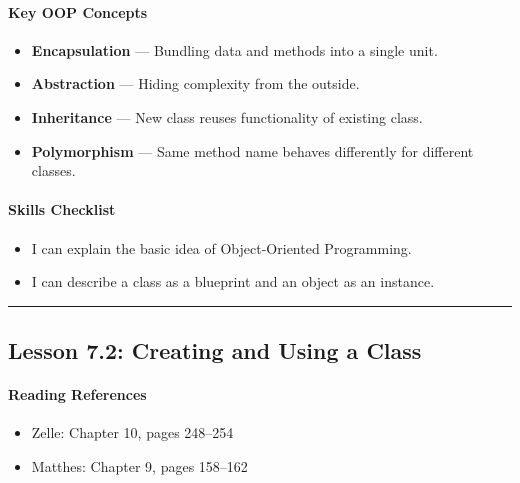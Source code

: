 \documentclass[
  justified,
  openright,
]{tufte-book}
\let\subsubsection\paragraph
\let\paragraph\paragraph
\let\subsubsection\paragraph
\let\paragraph\paragraph
\providecommand{\tightlist}{%
  \setlength{\itemsep}{0pt}\setlength{\parskip}{0pt}}
\begin{document}
\subsubsection{Key OOP Concepts}\label{key-oop-concepts}

\begin{itemize}
\tightlist
\item
  \textbf{Encapsulation} --- Bundling data and methods into a single
  unit.
\item
  \textbf{Abstraction} --- Hiding complexity from the outside.
\item
  \textbf{Inheritance} --- New class reuses functionality of existing
  class.
\item
  \textbf{Polymorphism} --- Same method name behaves differently for
  different classes.
\end{itemize}

\subsubsection{Skills Checklist}\label{skills-checklist-32}

\begin{itemize}
\tightlist
\item[$\square$]
  I can explain the basic idea of Object-Oriented Programming.
\item[$\square$]
  I can describe a class as a blueprint and an object as an instance.
\end{itemize}

\begin{center}\rule{0.5\linewidth}{0.5pt}\end{center}

\subsection{Lesson 7.2: Creating and Using a
Class}\label{lesson-7.2-creating-and-using-a-class}

\subsubsection{Reading References}\label{reading-references-20}

\begin{itemize}
\tightlist
\item
  Zelle: Chapter 10, pages 248--254
\item
  Matthes: Chapter 9, pages 158--162
\end{itemize}
\end{document}
